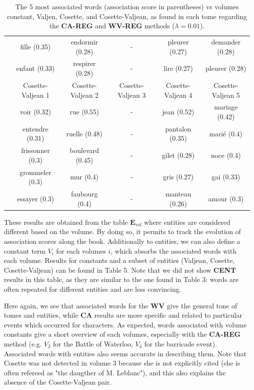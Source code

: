 \documentclass[
twocolumn,
]{ceurart}
\begin{document}
\begin{table}[!h]
\begin{tabular}{|c|c|c|c|c|c|}
		& fille (0.35) & endormir (0.28) & - & pleurer (0.27) & demander (0.28) \\
		& enfant (0.33) & respirer (0.28) & - & lire (0.27) & pleurer (0.28) \\
		\cline{2-6}
		& Cosette-Valjean 1 & Cosette-Valjean 2 & Cosette-Valjean 3 & Cosette-Valjean 4 & Cosette-Valjean 5 \\
		\cline{2-6}
		& voir (0.32) & rue (0.55) & - & jean (0.52) & mariage (0.42) \\ 
		& entendre (0.31) & ruelle (0.48) & - & pantalon (0.35) & marié (0.4) \\ 
		& frissonner (0.3) & boulevard (0.45) & - & gilet (0.28) & noce (0.4) \\ 
		& grommeler (0.3) & mur (0.4) & - & gris (0.27) & gai (0.33) \\ 
		& essayer (0.3) & faubourg (0.4) & - & manteau (0.26) & amour (0.3) \\ 
		\hline
	\end{tabular}
	\label{TIME_REG_word_vs_obj}
	\caption{The 5 most associated words (association score in parentheses) vs volumes constant, Valjen, Cosette, and Cosette-Valjean, as found in each tome regarding the \textbf{CA-REG} and \textbf{WV-REG} methods ($\lambda = 0.01$).}
\end{table}

These results are obtained from the table $\mathbf{E}_\text{vol}$ where entities are considered different based on the volume. By doing so, it permits to track the evolution of association scores along the book. Additionally to entities, we can also define a constant term $V_i$ for each volumes $i$, which absorbs the associated words with each volume. Results for constants and a subset of entities (Valjean, Cosette, Cosette-Valjean) can be found in Table 5. Note that we did not show \textbf{CENT} results in this table, as they are similar to the one found in Table 3: words are often repeated for different entities and are less convincing. 

Here again, we see that associated words for the \textbf{WV} give the general tone of tomes and entities, while \textbf{CA} results are more specific and related to particular events which occurred for characters. As expected, words associated with volume constants give a short overview of each volumes, especially with the \textbf{CA-REG} method (e.g. $V_2$ for the Battle of Waterloo, $V_4$ for the barricade event). Associated words with entities also seems accurate in describing them. Note that Cosette was not detected in volume 3 because she is not explicitly cited (she is often refereed as "the daugther of M. Leblanc"), and this also explains the absence of the Cosette-Valjean pair. 
\end{document}
